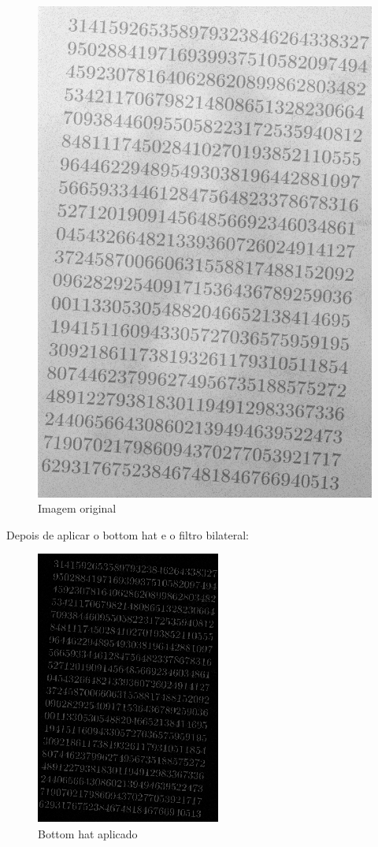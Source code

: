 \documentclass[conference]{IEEEtran}
\begin{document}
\begin{figure}[h]
    \centering
    \includegraphics[scale=0.20]{data/morf_test.png}
    \caption{Imagem original}
    \label{fig1}
\end{figure}

Depois de aplicar o bottom hat e o filtro bilateral:

\begin{figure}[h]
    \centering
    \includegraphics[scale=0.7]{data/bh1.png}
    \caption{Bottom hat aplicado}
    \label{fig2}
\end{figure}
\end{document}
